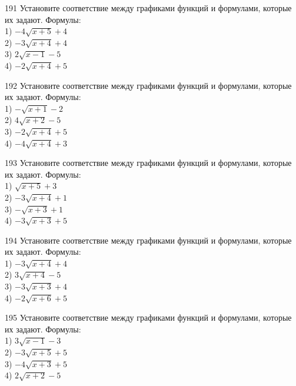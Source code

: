 \documentclass[4apaper]{article}
\begin{document}
\begin{taskBN}{191}
Установите соответствие между графиками функций и формулами, которые их задают. Формулы: \\1) $-4\sqrt{x+5}+4$\\2) $-3\sqrt{x+4}+4$\\3) $2\sqrt{x-1}-5$\\4) $-2\sqrt{x+4}+5$
\end{taskBN}

\begin{taskBN}{192}
Установите соответствие между графиками функций и формулами, которые их задают. Формулы: \\1) $-\sqrt{x+1}-2$\\2) $4\sqrt{x+2}-5$\\3) $-2\sqrt{x+4}+5$\\4) $-4\sqrt{x+4}+3$
\end{taskBN}

\begin{taskBN}{193}
Установите соответствие между графиками функций и формулами, которые их задают. Формулы: \\1) $\sqrt{x+5}+3$\\2) $-3\sqrt{x+4}+1$\\3) $-\sqrt{x+3}+1$\\4) $-3\sqrt{x+3}+5$
\end{taskBN}

\begin{taskBN}{194}
Установите соответствие между графиками функций и формулами, которые их задают. Формулы: \\1) $-3\sqrt{x+4}+4$\\2) $3\sqrt{x+4}-5$\\3) $-3\sqrt{x+3}+4$\\4) $-2\sqrt{x+6}+5$
\end{taskBN}

\begin{taskBN}{195}
Установите соответствие между графиками функций и формулами, которые их задают. Формулы: \\1) $3\sqrt{x-1}-3$\\2) $-3\sqrt{x+5}+5$\\3) $-4\sqrt{x+3}+5$\\4) $2\sqrt{x+2}-5$
\end{taskBN}
\end{document}
